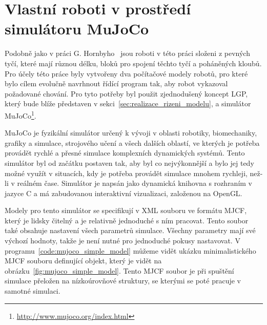 
\section{Vlastní roboti v prostředí simulátoru MuJoCo}
\label{sec:vlastni_roboti}

Podobně jako v práci G. Hornbyho~\cite{Hornby2003} jsou roboti v této práci složeni z pevných tyčí, které mají různou délku, bloků pro spojení těchto tyčí a poháněných kloubů.
Pro účely této práce byly vytvořeny dva počítačové modely robotů, pro které bylo cílem evolučně navrhnout řídící program tak, aby robot vykazoval požadované chování.
Pro tyto potřeby byl použit zjednodušený koncept LGP, který bude blíže představen v sekci~\ref{sec:realizace_rizeni_modelu}, a simulátor MuJoCo\footnote{\url{http://www.mujoco.org/index.html}}.

MuJoCo je fyzikální simulátor určený k vývoji v oblasti robotiky, biomechaniky, grafiky a simulace, strojového učení a všech dalších oblastí, ve kterých je potřeba provádět rychlé a přesné simulace komplexních dynamických systémů.
Tento simulátor byl od začátku postaven tak, aby byl co nejvýkonnější a bylo jej tedy možné využít v situacích, kdy je potřeba provádět simulace mnohem rychleji, než-li v reálném čase.
Simulátor je napsán jako dynamická knihovna s rozhraním v jazyce C a má zabudovanou interaktivní vizualizaci, založenou na OpenGL.

Modely pro tento simulátor se specifikují v XML souboru ve formátu MJCF, který je lidsky čitelný a je relativně jednoduché s ním pracovat.
Tento soubor také obsahuje nastavení všech parametrů simulace.
Všechny parametry mají své výchozí hodnoty, takže je není nutné pro jednoduché pokusy nastavovat.
V programu~\ref{code:mujoco_simple_model} můžeme vidět ukázku minimalistického MJCF souboru definující objekt, který je vidět na obrázku~\ref{fig:mujoco_simple_model}.
Tento MJCF soubor je při spuštění simulace přeložen na nízkoúrovňové struktury, se kterými se poté pracuje v samotné simulaci.

